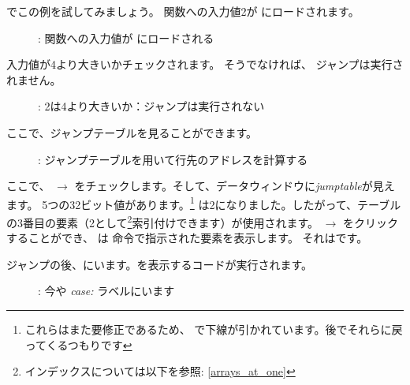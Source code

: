 ﻿\clearpage
\mysubparagraph{\olly}
\myindex{\olly}

\olly でこの例を試してみましょう。
関数への入力値2が \EAX にロードされます。

\begin{figure}[H]
\centering
{}
\caption{\olly: 関数への入力値が \EAX にロードされる}
\label{fig:switch_lot_olly1}
\end{figure}

\clearpage
入力値が4より大きいかチェックされます。
そうでなければ、 ジャンプは実行されません。

\begin{figure}[H]
\centering
{}
\caption{\olly: 2は4より大きいか：ジャンプは実行されない}
\label{fig:switch_lot_olly2}
\end{figure}

\clearpage
ここで、ジャンプテーブルを見ることができます。

\begin{figure}[H]
\centering
{}
\caption{\olly: ジャンプテーブルを用いて行先のアドレスを計算する}
\label{fig:switch_lot_olly3}
\end{figure}

ここで、 $\rightarrow$  をチェックします。そして、データウィンドウに\emph{jumptable}が見えます。
5つの32ビット値があります。\footnote{これらはまた要修正であるため、 \olly で下線が引かれています。後でそれらに戻ってくるつもりです}
\ECX は2になりました。したがって、テーブルの3番目の要素（2として\footnote{インデックスについては以下を参照: \ref{arrays_at_one}}索引付けできます）が使用されます。
 $\rightarrow$ をクリックすることができ、
\olly は \JMP 命令で指示された要素を表示します。
それはです。

\clearpage
ジャンプの後、にいます。を表示するコードが実行されます。

\begin{figure}[H]
\centering
{}
\caption{\olly: 今や \emph{case:} ラベルにいます}
\label{fig:switch_lot_olly4}
\end{figure}
